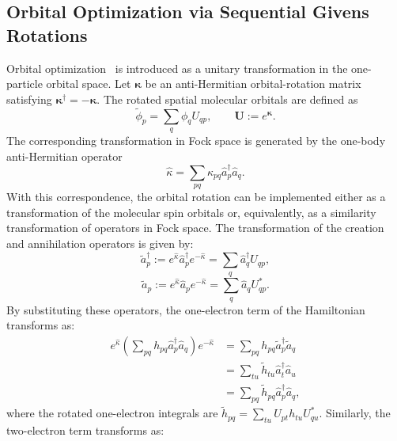 \documentclass[
 reprint,
 amsmath,amssymb,
 aps,
 physrev,
]{revtex4-2}
\begin{document}
\subsection{Orbital Optimization via Sequential Givens Rotations}
%
Orbital optimization~\cite{ivanic2003,mizukami2020} is introduced as a unitary transformation in the one-particle orbital space. Let \( \boldsymbol{\kappa} \) be an anti-Hermitian orbital-rotation matrix satisfying \( \boldsymbol{\kappa}^{\dagger}=-\boldsymbol{\kappa} \). The rotated spatial molecular orbitals are defined as
%
\begin{equation}
    \label{eq:oo_unitary_rotation}
    \tilde{\phi}_p
    =
    \sum_q
    \phi_q U_{qp},
    \qquad
    \mathbf{U}
    :=
    e^{\boldsymbol{\kappa}} .
\end{equation}
%
The corresponding transformation in Fock space is generated by the one-body anti-Hermitian operator
%
\begin{equation}
    \hat{\kappa}
    =
    \sum_{pq}
    \kappa_{pq}
    \hat{a}_{p}^{\dagger}
    \hat{a}_{q}.
\end{equation}
%
With this correspondence, the orbital rotation can be implemented either as a transformation of the molecular spin orbitals or, equivalently, as a similarity transformation of operators in Fock space.
The transformation of the creation and annihilation operators is given by:
%
\begin{equation}
    \tilde{a}_{p}^\dagger
    :=
    e^{\hat{\kappa}}
    \hat{a}_{p}^\dagger
    e^{-\hat{\kappa}}
    =
    \sum_q
    \hat{a}_{q}^\dagger U_{qp},
\end{equation}
%
\begin{equation}
    \tilde{a}_{p}
    :=
    e^{\hat{\kappa}}
    \hat{a}_{p}
    e^{-\hat{\kappa}}
    =
    \sum_q
    \hat{a}_{q} U_{qp}^*.
\end{equation}
%
By substituting these operators, the one-electron term of the Hamiltonian transforms as:
%
\begin{align}
    \label{eq:one_electron_transform}
    e^{\hat{\kappa}} \left( \sum_{pq} h_{pq} \hat{a}_p^\dagger \hat{a}_q \right) e^{-\hat{\kappa}}
     & = \sum_{pq} h_{pq} \tilde{a}_p^\dagger \tilde{a}_q \nonumber         \\
     & = \sum_{tu} \tilde{h}_{tu} \hat{a}_{t}^\dagger \hat{a}_{u} \nonumber \\
     & = \sum_{pq} \tilde{h}_{pq} \hat{a}_p^\dagger \hat{a}_q,
\end{align}
%
where the rotated one-electron integrals are \( \tilde{h}_{pq} = \sum_{tu} U_{pt} h_{tu} U_{qu}^*  \). Similarly, the two-electron term transforms as:
\end{document}
